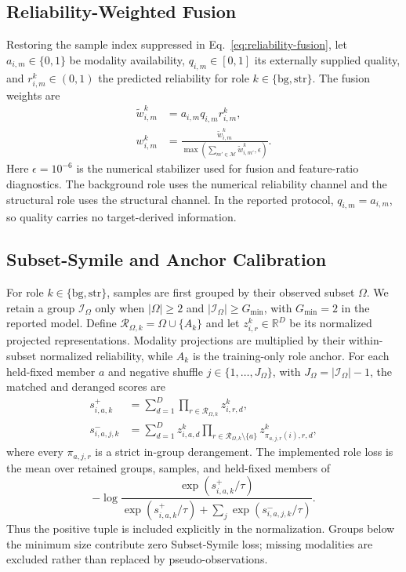 \documentclass[letterpaper]{article}
\begin{document}
\subsection{Reliability-Weighted Fusion}
Restoring the sample index suppressed in Eq.~\ref{eq:reliability-fusion}, let $a_{i,m}\in\{0,1\}$ be modality availability, $q_{i,m}\in[0,1]$ its externally supplied quality, and $r_{i,m}^k\in(0,1)$ the predicted reliability for role $k\in\{\mathrm{bg},\mathrm{str}\}$. The fusion weights are
\begin{align}
\widetilde w_{i,m}^k
&=a_{i,m}q_{i,m}r_{i,m}^k,\nonumber\\
w_{i,m}^k
&=\frac{\widetilde w_{i,m}^k}
{\max\!\left(\sum_{m'\in\mathcal M}\widetilde w_{i,m'}^k,\epsilon\right)}.
\label{eq:fusion-normalization}
\end{align}
Here $\epsilon=10^{-6}$ is the numerical stabilizer used for fusion and feature-ratio diagnostics.
The background role uses the numerical reliability channel and the structural role uses the structural channel. In the reported protocol, $q_{i,m}=a_{i,m}$, so quality carries no target-derived information.

\subsection{Subset-Symile and Anchor Calibration}
For role $k\in\{\mathrm{bg},\mathrm{str}\}$, samples are first grouped by their observed subset $\Omega$. We retain a group $\mathcal I_\Omega$ only when $|\Omega|\ge2$ and $|\mathcal I_\Omega|\ge G_{\min}$, with $G_{\min}=2$ in the reported model. Define $\mathcal R_{\Omega,k}=\Omega\cup\{A_k\}$ and let $z^k_{i,r}\in\mathbb R^D$ be its normalized projected representations. Modality projections are multiplied by their within-subset normalized reliability, while $A_k$ is the training-only role anchor. For each held-fixed member $a$ and negative shuffle $j\in\{1,\ldots,J_\Omega\}$, with $J_\Omega=|\mathcal I_\Omega|-1$, the matched and deranged scores are
\begin{align}
s^+_{i,a,k}
&=\sum_{d=1}^{D}\prod_{r\in\mathcal R_{\Omega,k}} z^k_{i,r,d},\\
s^-_{i,a,j,k}
&=\sum_{d=1}^{D}z^k_{i,a,d}
\prod_{r\in\mathcal R_{\Omega,k}\setminus\{a\}}
z^k_{\pi_{a,j,r}(i),r,d},
\end{align}
where every $\pi_{a,j,r}$ is a strict in-group derangement. The implemented role loss is the mean over retained groups, samples, and held-fixed members of
\begin{equation}
-\log
\frac{\exp(s^+_{i,a,k}/\tau)}
{\exp(s^+_{i,a,k}/\tau)+\sum_j\exp(s^-_{i,a,j,k}/\tau)}.
\label{eq:subset-symile-detail}
\end{equation}
Thus the positive tuple is included explicitly in the normalization. Groups below the minimum size contribute zero Subset-Symile loss; missing modalities are excluded rather than replaced by pseudo-observations.
\end{document}
